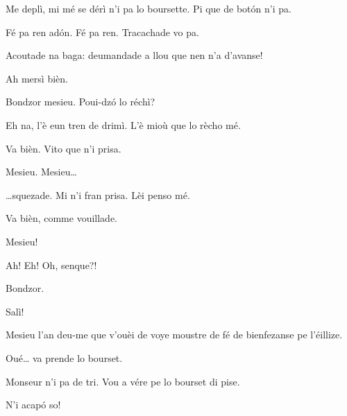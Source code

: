 \begin{drama}
\Gerominespeaks Me deplì, mi mé se dérì n'i pa lo boursette. Pi que de bot\'on n'i pa.

\Priespeaks Fé pa ren ad\'on. Fé pa ren. Tracachade vo pa.

\Casimirspeaks Acoutade na baga:  deumandade a llou que nen n'a d’avanse!

\Priespeaks Ah mersì bièn.


\Priespeaks{} Bondzor mesieu. Poui-dz\'o lo réchì?

\Eunfeurmispeaks Eh na, l'è eun tren de drimì. L'è mioù que lo rècho mé.

\Priespeaks Va bièn. Vito que n'i prisa.


\Eunfeurmispeaks{} Mesieu. Mesieu\ldots


\Priespeaks \ldots squezade. Mi n'i fran prisa. Lèi penso mé.

\Eunfeurmispeaks Va bièn, comme vouillade.


\Priespeaks{} Mesieu!


\PersEmpourtantaspeaks Ah! Eh! Oh, senque?!

\Priespeaks Bondzor.

\PersEmpourtantaspeaks Salì!

\Priespeaks Mesieu l’an deu-me que v'ouèi de voye moustre de fé de bienfezanse pe l’éillize.

\PersEmpourtantaspeaks Oué\ldots {} va prende lo bourset.


\Eunfeurmispeaks Monseur n'i pa de tri. Vou a vére pe lo bourset di pise.


\Eunfeurmispeaks N'i acap\'o so!


\end{drama}
